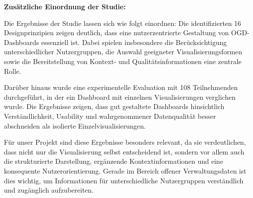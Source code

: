 \smallskip
\noindent
\textbf{Zusätzliche Einordnung der Studie:}

\smallskip
\noindent
Die Ergebnisse der Studie lassen sich wie folgt einordnen: Die identifizierten 16 Designprinzipien zeigen deutlich, dass eine nutzerzentrierte Gestaltung von OGD-Dashboards essenziell ist. Dabei spielen insbesondere die Berücksichtigung unterschiedlicher Nutzergruppen, die Auswahl geeigneter Visualisierungsformen sowie die Bereitstellung von Kontext- und Qualitätsinformationen eine zentrale Rolle.

\smallskip
\noindent
Darüber hinaus wurde eine experimentelle Evaluation mit 108 Teilnehmenden durchgeführt, in der ein Dashboard mit einzelnen Visualisierungen verglichen wurde. Die Ergebnisse zeigen, dass gut gestaltete Dashboards hinsichtlich Verständlichkeit, Usability und wahrgenommener Datenqualität besser abschneiden als isolierte Einzelvisualisierungen.

\smallskip
\noindent
Für unser Projekt sind diese Ergebnisse besonders relevant, da sie verdeutlichen, dass nicht nur die Visualisierung selbst entscheidend ist, sondern vor allem auch die strukturierte Darstellung, ergänzende Kontextinformationen und eine konsequente Nutzerorientierung. Gerade im Bereich offener Verwaltungsdaten ist dies wichtig, um Informationen für unterschiedliche Nutzergruppen verständlich und zugänglich aufzubereiten.